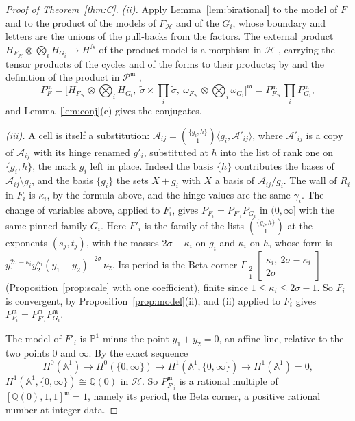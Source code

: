 \documentclass[11pt]{article}
\theoremstyle{plain}
\theoremstyle{definition}
\theoremstyle{remark}
\newcommand{\Q}{\mathbb Q}
\newcommand{\PP}{\mathbb P}
\newcommand{\m}{\mathfrak m}
\newcommand{\tsig}{\widetilde\sigma}
\newcommand{\Gst}[4]{\Gamma_{\substack{#1\\#2}}\!\begin{bmatrix}#3\\#4\end{bmatrix}}
\begin{document}
\begin{proof}[Proof of Theorem~\ref{thm:C}]
\emph{(ii).} Apply Lemma~\ref{lem:birational} to the model of $F$ and to the product of the models of $F_{\mathcal H}$ and of the $G_i$, whose boundary and letters are the unions of the pull-backs from the factors. The external product $H_{F_{\mathcal H}}\otimes\bigotimes_iH_{G_i}\to H^N$ of the product model is a morphism in $\mathcal H$ \cite{HMS}, carrying the tensor products of the cycles and of the forms to their products; by \cite[\S2.2(ii)]{B1} and the definition of the product in $\mathcal P^{\m}$ \cite[\S2]{B1},
\[
P_F^{\m}=\Big[H_{F_{\mathcal H}}\otimes\bigotimes_iH_{G_i},\ \tsig\times\prod_i\tsig,\ \omega_{F_{\mathcal H}}\otimes\bigotimes_i\omega_{G_i}\Big]^{\m}=P_{F_{\mathcal H}}^{\m}\prod_iP_{G_i}^{\m},
\]
and Lemma~\ref{lem:conj}(c) gives the conjugates.

\emph{(iii).} A cell is itself a substitution: $\mathcal A_{ij}=\binom{\{g_i,h\}}1\langle g_i,\mathcal A'_{ij}\rangle$, where $\mathcal A'_{ij}$ is a copy of $\mathcal A_{ij}$ with its hinge renamed $g'_i$, substituted at $h$ into the list of rank one on $\{g_i,h\}$, the mark $g_i$ left in place. Indeed the basis $\{h\}$ contributes the bases of $\mathcal A_{ij}\setminus g_i$, and the basis $\{g_i\}$ the sets $X+g_i$ with $X$ a basis of $\mathcal A_{ij}/g_i$. The wall of $R_i$ in $F_i$ is $\kappa_i$, by the formula above, and the hinge values are the same $\gamma_i$. The change of variables above, applied to $F_i$, gives $P_{F_i}=P_{F'_i}P_{G_i}$ in $(0,\infty]$ with the same pinned family $G_i$. Here $F'_i$ is the family of the lists $\binom{\{g_i,h\}}1$ at the exponents $(s_j,t_j)$, with the masses $2\sigma-\kappa_i$ on $g_i$ and $\kappa_i$ on $h$, whose form is $y_1^{2\sigma-\kappa_i}y_2^{\kappa_i}(y_1+y_2)^{-2\sigma}\,\nu_2$. Its period is the Beta corner $\Gst21{\kappa_i,\ 2\sigma-\kappa_i}{2\sigma}$ (Proposition~\ref{prop:scale} with one coefficient), finite since $1\le\kappa_i\le2\sigma-1$. So $F_i$ is convergent, by Proposition~\ref{prop:model}(ii), and (ii) applied to $F_i$ gives $P_{F_i}^{\m}=P_{F'_i}^{\m}P_{G_i}^{\m}$.

The model of $F'_i$ is $\PP^1$ minus the point $y_1+y_2=0$, an affine line, relative to the two points $0$ and $\infty$. By the exact sequence
\[
H^0(\mathbb A^1)\to H^0(\{0,\infty\})\to H^1(\mathbb A^1,\{0,\infty\})\to H^1(\mathbb A^1)=0,
\]
$H^1(\mathbb A^1,\{0,\infty\})\cong\Q(0)$ in $\mathcal H$. So $P_{F'_i}^{\m}$ is a rational multiple of $[\Q(0),1,1]^{\m}=1$, namely its period, the Beta corner, a positive rational number at integer data.
\end{proof}
\end{document}
